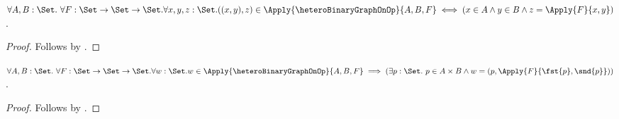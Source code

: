 \begin{proposition}\label{logical_heterogeneous_binary_graph_on_membership}
    $\forall A,B:\Set.\ \forall F:\Set\to\Set\to\Set.
     \forall x,y,z:\Set.
        ((x,y),z)\in
            \Apply{\heteroBinaryGraphOnOp}{A,B,F}
        \iff
        (x\in A\land y\in B\land z=\Apply{F}{x,y})$.
\end{proposition}
\begin{proof}
    Follows by
        .
\end{proof}

\begin{proposition}\label{logical_heterogeneous_binary_graph_on_elim}
    $\forall A,B:\Set.\ \forall F:\Set\to\Set\to\Set.
     \forall w:\Set.
        w\in\Apply{\heteroBinaryGraphOnOp}{A,B,F}
        \implies
        (\exists p:\Set.\ p\in A\times B\land
            w=(p,\Apply{F}{\fst{p},\snd{p}}))$.
\end{proposition}
\begin{proof}
    Follows by .
\end{proof}

